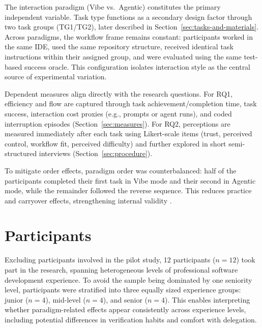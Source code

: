 The interaction paradigm (Vibe vs.\ Agentic) constitutes the primary independent variable. Task type functions as a secondary design factor through two task groups (TG1/TG2), later described in Section~\ref{sec:tasks-and-materials}. Across paradigms, the workflow frame remains constant: participants worked in the same IDE, used the same repository structure, received identical task instructions within their assigned group, and were evaluated using the same test-based success oracle. This configuration isolates interaction style as the central source of experimental variation.

Dependent measures align directly with the research questions. For RQ1, efficiency and flow are captured through task achievement/completion time, task success, interaction cost proxies (e.g., prompts or agent runs), and coded interruption episodes (Section~\ref{sec:measures}). For RQ2, perceptions are measured immediately after each task using Likert-scale items (trust, perceived control, workflow fit, perceived difficulty) and further explored in short semi-structured interviews (Section~\ref{sec:procedure}).

To mitigate order effects, paradigm order was counterbalanced: half of the participants completed their first task in Vibe mode and their second in Agentic mode, while the remainder followed the reverse sequence. This reduces practice and carryover effects, strengthening internal validity \parencite{wohlin2012experimentation}.

\section{Participants} %
\label{sec:participants}

Excluding participants involved in the pilot study, 12 participants ($n=12$) took part in the research, spanning heterogeneous levels of professional software development experience. To avoid the sample being dominated by one seniority level, participants were stratified into three equally sized experience groups: junior ($n=4$), mid-level ($n=4$), and senior ($n=4$). This enables interpreting whether paradigm-related effects appear consistently across experience levels, including potential differences in verification habits and comfort with delegation.

